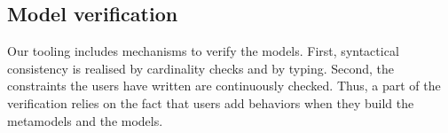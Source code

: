 \subsection{Model verification}


Our tooling includes mechanisms to verify the models. First, syntactical
consistency is realised by cardinality checks and by typing. Second, the
constraints the users have written are continuously checked. Thus, a part of
the verification relies on the fact that users add behaviors when they build
the metamodels and the models.
